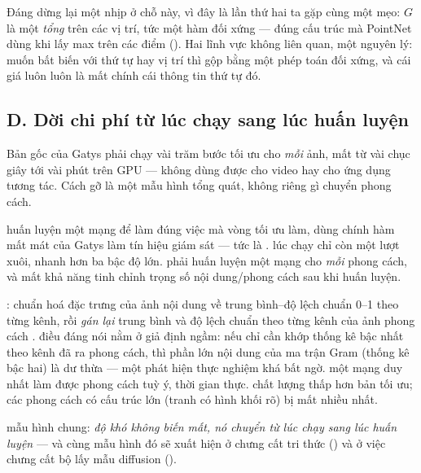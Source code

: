 \documentclass[../../../deep_learning.tex]{subfiles}
\begin{document}
Đáng dừng lại một nhịp ở chỗ này, vì đây là lần thứ hai ta gặp cùng một mẹo: \(G\) là một \emph{tổng} trên các vị trí, tức một hàm đối xứng --- đúng cấu trúc mà PointNet dùng khi lấy max trên các điểm (). Hai lĩnh vực không liên quan, một nguyên lý: muốn bất biến với thứ tự hay vị trí thì gộp bằng một phép toán đối xứng, và cái giá luôn luôn là mất chính cái thông tin thứ tự đó.

\subsection{D. Dời chi phí từ lúc chạy sang lúc huấn luyện}
Bản gốc của Gatys phải chạy vài trăm bước tối ưu cho \emph{mỗi} ảnh, mất từ vài chục giây tới vài phút trên GPU --- không dùng được cho video hay cho ứng dụng tương tác. Cách gỡ là một mẫu hình tổng quát, không riêng gì chuyển phong cách.

\begin{mach}
\item {} \gp huấn luyện một mạng  để làm đúng việc mà vòng tối ưu làm, dùng chính hàm mất mát của Gatys làm tín hiệu giám sát --- tức là  \cite{johnson2016perceptual}. \hq lúc chạy chỉ còn một lượt xuôi, nhanh hơn ba bậc độ lớn. \gia phải huấn luyện một mạng cho \emph{mỗi} phong cách, và mất khả năng tinh chỉnh trọng số nội dung/phong cách sau khi huấn luyện.
\item {} \gp {}: chuẩn hoá đặc trưng của ảnh nội dung về trung bình--độ lệch chuẩn 0--1 theo từng kênh, rồi \emph{gán lại} trung bình và độ lệch chuẩn theo từng kênh của ảnh phong cách \cite{huang2017adain}. \gd điều đáng nói nằm ở giả định ngầm: nếu chỉ cần khớp thống kê bậc nhất theo kênh đã ra phong cách, thì phần lớn nội dung của ma trận Gram (thống kê bậc hai) là dư thừa --- một phát hiện thực nghiệm khá bất ngờ. \hq một mạng duy nhất làm được phong cách tuỳ ý, thời gian thực. \gia chất lượng thấp hơn bản tối ưu; các phong cách có cấu trúc lớn (tranh có hình khối rõ) bị mất nhiều nhất.
\item {} \hq mẫu hình chung: \emph{độ khó không biến mất, nó chuyển từ lúc chạy sang lúc huấn luyện} --- và cùng mẫu hình đó sẽ xuất hiện ở chưng cất tri thức () và ở việc chưng cất bộ lấy mẫu diffusion ().
\end{mach}
\end{document}
